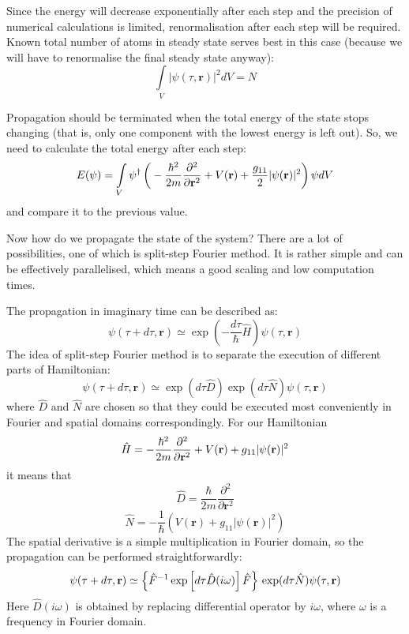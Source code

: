 \documentclass[12pt,notitlepage]{report}
\begin{document}
Since the energy will decrease exponentially after each step and the precision of numerical calculations is limited,
renormalisation after each step will be required. Known total number of atoms in steady
state serves best in this case (because we will have to renormalise the final steady state anyway):
\[ \int\limits_V \vert \psi(\tau, \mathbf{r}) \vert^2 dV = N \]

Propagation should be terminated when the total energy of the state stops changing (that is, only one component
with the lowest energy is left out). So, we need to calculate the total energy after each step:
\[ E(\psi) = \int\limits_V \psi^\dagger \left( \\
-\frac{\hbar^2}{2m} \frac{\partial^2}{\partial \mathbf{r}^2} + V(\mathbf{r}) + \\
\frac{g_{11}}{2} \vert \psi(\mathbf{r}) \vert^2 \right) \psi dV \]
and compare it to the previous value.

Now how do we propagate the state of the system? There are a lot of possibilities, one of which is split-step
Fourier method. It is rather simple and can be effectively parallelised, which means a good scaling and 
low computation times. 

The propagation in imaginary time can be described as:
\[ \psi(\tau + d\tau, \mathbf{r}) \simeq \exp \left( -\frac{d\tau}{\hbar} \hat{H} \right) \psi(\tau, \mathbf{r}) \]
The idea of split-step Fourier method is to separate the execution of different parts of Hamiltonian:
\begin{equation}
\label{split_step_steady_state:splitted_propagation}
\psi(\tau + d\tau, \mathbf{r}) \simeq \exp(d\tau \hat{D}) \exp(d\tau \hat{N}) \psi(\tau, \mathbf{r})
\end{equation}
where $\hat{D}$ and $\hat{N}$ are chosen so that they could be executed most conveniently in Fourier and spatial
domains correspondingly. For our Hamiltonian
\[ 
\hat{H} = -\frac{\hbar^2}{2m} \frac{\partial^2}{\partial \mathbf{r}^2} + \\
V(\mathbf{r}) + g_{11} \vert \psi(\mathbf{r}) \vert^2 
\]
it means that
\[ \hat{D} = \frac{\hbar}{2m} \frac{\partial^2}{\partial \mathbf{r}^2} \]
\[ \hat{N} = -\frac{1}{\hbar} \left( V(\mathbf{r}) + g_{11} \vert \psi(\mathbf{r}) \vert^2 \right) \] 
The spatial derivative is a simple multiplication in Fourier domain, so the propagation can be performed 
straightforwardly:
\[ 
\psi(\tau + d\tau, \mathbf{r}) \simeq \left\{ \hat{F}^{-1} \exp \left[ d\tau \hat{D}(i\omega) \right] \hat{F} \right\} \\
\exp(d\tau \hat{N}) \psi(\tau, \mathbf{r})
\]
Here $\hat{D}(i\omega)$ is obtained by replacing differential operator by $i \omega$, where $\omega$ is a
frequency in Fourier domain.
\end{document}

